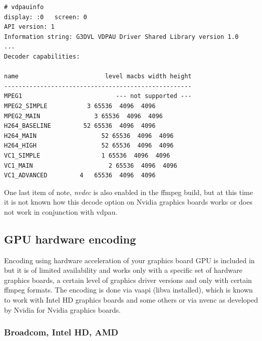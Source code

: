 \begin{lstlisting}[numbers=none]
# vdpauinfo
display: :0   screen: 0
API version: 1
Information string: G3DVL VDPAU Driver Shared Library version 1.0
...
Decoder capabilities:

name                        level macbs width height
----------------------------------------------------
MPEG1                          --- not supported ---                                                                      
MPEG2_SIMPLE           3 65536  4096  4096                                                                       
MPEG2_MAIN               3 65536  4096  4096                                                                       
H264_BASELINE         52 65536  4096  4096                                                                       
H264_MAIN                  52 65536  4096  4096                                                                       
H264_HIGH                  52 65536  4096  4096                                                                       
VC1_SIMPLE                 1 65536  4096  4096                                                                       
VC1_MAIN                     2 65536  4096  4096                                                                       
VC1_ADVANCED         4   65536  4096  4096 
\end{lstlisting}

One last item of note, \textit{nvdec} is also enabled in the ffmpeg build, but at this time it is not known how this decode option on Nvidia graphics boards works or does not work in conjunction with vdpau.

\subsection{GPU hardware encoding}%
\label{sub:gpu_hardware_encoding}

Encoding using hardware acceleration of your graphics board GPU is
included in \CGG{} but it is of limited availability and works only
with a specific set of hardware graphics boards, a certain level of
graphics driver versions and only with certain ffmpeg formats.  The
encoding is done via vaapi (libva installed), which is known to work
with Intel HD graphics boards and some others or via nvenc as
developed by Nvidia for Nvidia graphics boards.

\subsubsection*{Broadcom, Intel HD, AMD}%
\label{ssub:broadcom_intel_amd}

